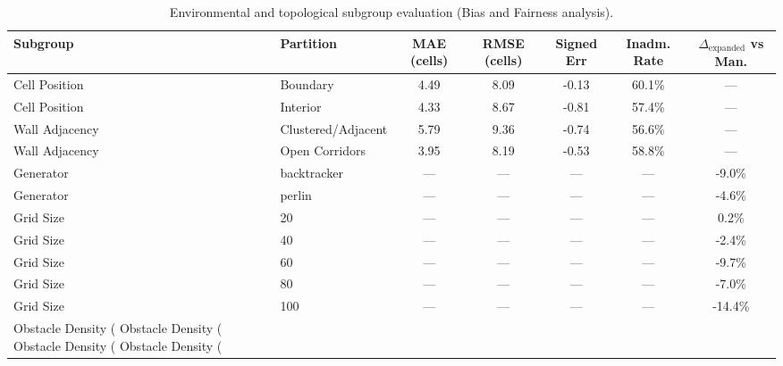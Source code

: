 \begin{table}[H]
\centering
\small
\begin{tabular}{llccccc}
\toprule
\textbf{Subgroup} & \textbf{Partition} & \textbf{MAE (cells)} & \textbf{RMSE (cells)} & \textbf{Signed Err} & \textbf{Inadm. Rate} & \textbf{$\Delta_{\text{expanded}}$ vs Man.} \\
\midrule
Cell Position & Boundary & 4.49 & 8.09 & -0.13 & 60.1\% & --- \\
Cell Position & Interior & 4.33 & 8.67 & -0.81 & 57.4\% & --- \\
Wall Adjacency & Clustered/Adjacent & 5.79 & 9.36 & -0.74 & 56.6\% & --- \\
Wall Adjacency & Open Corridors & 3.95 & 8.19 & -0.53 & 58.8\% & --- \\
Generator & backtracker & --- & --- & --- & --- & -9.0\% \\
Generator & perlin & --- & --- & --- & --- & -4.6\% \\
Grid Size & 20 & --- & --- & --- & --- & 0.2\% \\
Grid Size & 40 & --- & --- & --- & --- & -2.4\% \\
Grid Size & 60 & --- & --- & --- & --- & -9.7\% \\
Grid Size & 80 & --- & --- & --- & --- & -7.0\% \\
Grid Size & 100 & --- & --- & --- & --- & -14.4\% \\
Obstacle Density (%
Obstacle Density (%
Obstacle Density (%
Obstacle Density (%
\bottomrule
\end{tabular}
\caption{Environmental and topological subgroup evaluation (Bias and Fairness analysis).}
\label{tab:bias_results}
\end{table}
